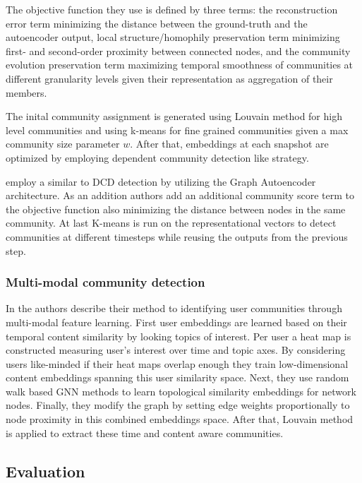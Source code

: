 \documentclass[
acmsmall,
nonacm,
screen,
acmthm]{../../scripts/pandoc/templates/acmart}
\begin{document}
The objective function they use is defined by three terms: the
reconstruction error term minimizing the distance between the
ground-truth and the autoencoder output, local structure/homophily
preservation term minimizing first- and second-order proximity between
connected nodes, and the community evolution preservation term
maximizing temporal smoothness of communities at different granularity
levels given their representation as aggregation of their members.

The inital community assignment is generated using Louvain method for
high level communities and using k-means for fine grained communities
given a max community size parameter \(w\). After that, embeddings at
each snapshot are optimized by employing dependent community detection
like strategy.

\citet{wangEvolutionaryAutoencoderDynamic2020} employ a similar to DCD
detection by utilizing the Graph Autoencoder architecture. As an
addition authors add an additional community score term to the objective
function also minimizing the distance between nodes in the same
community. At last K-means is run on the representational vectors to
detect communities at different timesteps while reusing the outputs from
the previous step.

\hypertarget{multi-modal-community-detection}{%
\subsubsection{Multi-modal community
detection}\label{multi-modal-community-detection}}

In \citet{faniUserCommunityDetection2020} the authors describe their
method to identifying user communities through multi-modal feature
learning. First user embeddings are learned based on their temporal
content similarity by looking topics of interest. Per user a heat map is
constructed measuring user's interest over time and topic axes. By
considering users like-minded if their heat maps overlap enough they
train low-dimensional content embeddings spanning this user similarity
space. Next, they use random walk based GNN methods to learn topological
similarity embeddings for network nodes. Finally, they modify the graph
by setting edge weights proportionally to node proximity in this
combined embeddings space. After that, Louvain method is applied to
extract these time and content aware communities.

\hypertarget{evaluation}{%
\subsection{Evaluation}\label{evaluation}}
\end{document}
